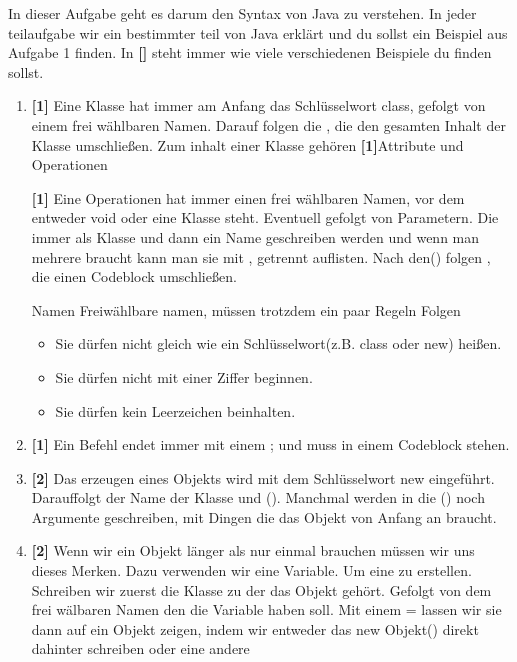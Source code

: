 
In dieser Aufgabe geht es darum den Syntax von Java zu verstehen.
In jeder teilaufgabe wir ein bestimmter teil von Java erklärt und du sollst ein Beispiel aus Aufgabe 1 finden. In \textbf{[]} steht immer wie viele verschiedenen Beispiele du finden sollst.

\begin{enumerate}
    \item \textbf{[1]} Eine Klasse hat immer am Anfang das Schlüsselwort class, gefolgt von einem frei wählbaren Namen. Darauf folgen die { }, die den gesamten Inhalt der Klasse umschließen.
    Zum inhalt einer Klasse gehören \textbf{[1]}Attribute und Operationen

    \textbf{[1]} Eine Operationen hat immer einen frei wählbaren Namen, vor dem entweder void oder eine Klasse steht. Eventuell gefolgt von Parametern. Die immer als Klasse und dann ein Name geschreiben werden und wenn man mehrere braucht kann man sie mit , getrennt auflisten.
    Nach den() folgen {}, die einen Codeblock umschließen.
    \begin{Infobox}{Namen}
        Freiwählbare namen, müssen trotzdem ein paar Regeln Folgen
        \begin{itemize}
            \item Sie dürfen nicht gleich wie ein Schlüsselwort(z.B. class oder new) heißen.
            \item Sie dürfen nicht mit einer Ziffer beginnen.
            \item Sie dürfen kein Leerzeichen beinhalten.
        \end{itemize}
    \end{Infobox}
    \item \textbf{[1]} Ein Befehl endet immer mit einem ; und muss in einem Codeblock stehen.
    \item \textbf{[2]} Das erzeugen eines Objekts wird mit dem Schlüsselwort new eingeführt. Darauffolgt der Name der Klasse und (). Manchmal werden in die () noch Argumente geschreiben, mit Dingen die das Objekt von Anfang an braucht.
    \item \textbf{[2]} Wenn wir ein Objekt länger als nur einmal brauchen müssen wir uns dieses Merken. Dazu verwenden wir eine Variable. Um eine zu erstellen. Schreiben wir zuerst die Klasse zu der das Objekt gehört. Gefolgt von dem frei wälbaren Namen den die Variable haben soll. Mit einem = lassen wir sie dann auf ein Objekt zeigen, indem wir entweder das new Objekt() direkt dahinter schreiben oder eine andere 

\end{enumerate}
